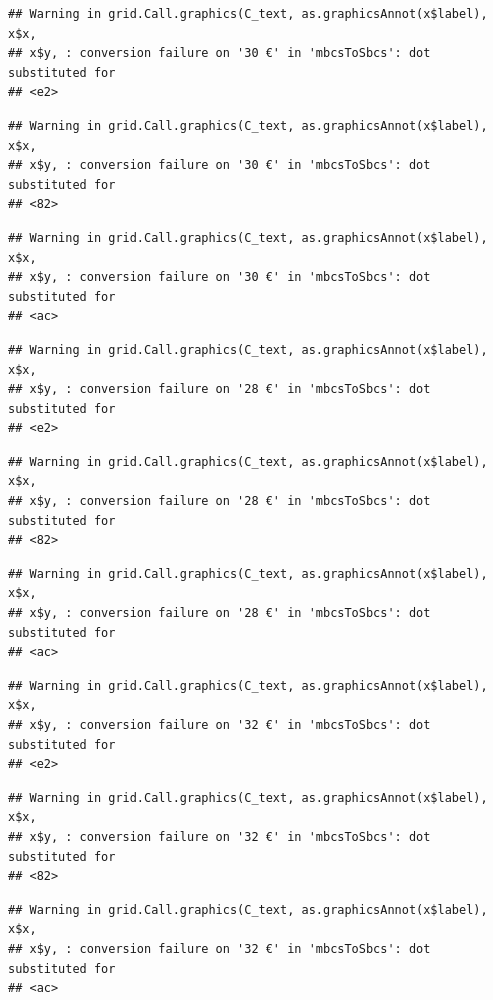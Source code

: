 \documentclass[]{gitbook}
\theoremstyle{definition}
\theoremstyle{definition}
\theoremstyle{definition}
\theoremstyle{remark}
\begin{document}
\begin{verbatim}
## Warning in grid.Call.graphics(C_text, as.graphicsAnnot(x$label), x$x,
## x$y, : conversion failure on '30 €' in 'mbcsToSbcs': dot substituted for
## <e2>
\end{verbatim}

\begin{verbatim}
## Warning in grid.Call.graphics(C_text, as.graphicsAnnot(x$label), x$x,
## x$y, : conversion failure on '30 €' in 'mbcsToSbcs': dot substituted for
## <82>
\end{verbatim}

\begin{verbatim}
## Warning in grid.Call.graphics(C_text, as.graphicsAnnot(x$label), x$x,
## x$y, : conversion failure on '30 €' in 'mbcsToSbcs': dot substituted for
## <ac>
\end{verbatim}

\begin{verbatim}
## Warning in grid.Call.graphics(C_text, as.graphicsAnnot(x$label), x$x,
## x$y, : conversion failure on '28 €' in 'mbcsToSbcs': dot substituted for
## <e2>
\end{verbatim}

\begin{verbatim}
## Warning in grid.Call.graphics(C_text, as.graphicsAnnot(x$label), x$x,
## x$y, : conversion failure on '28 €' in 'mbcsToSbcs': dot substituted for
## <82>
\end{verbatim}

\begin{verbatim}
## Warning in grid.Call.graphics(C_text, as.graphicsAnnot(x$label), x$x,
## x$y, : conversion failure on '28 €' in 'mbcsToSbcs': dot substituted for
## <ac>
\end{verbatim}

\begin{verbatim}
## Warning in grid.Call.graphics(C_text, as.graphicsAnnot(x$label), x$x,
## x$y, : conversion failure on '32 €' in 'mbcsToSbcs': dot substituted for
## <e2>
\end{verbatim}

\begin{verbatim}
## Warning in grid.Call.graphics(C_text, as.graphicsAnnot(x$label), x$x,
## x$y, : conversion failure on '32 €' in 'mbcsToSbcs': dot substituted for
## <82>
\end{verbatim}

\begin{verbatim}
## Warning in grid.Call.graphics(C_text, as.graphicsAnnot(x$label), x$x,
## x$y, : conversion failure on '32 €' in 'mbcsToSbcs': dot substituted for
## <ac>
\end{verbatim}
\end{document}
